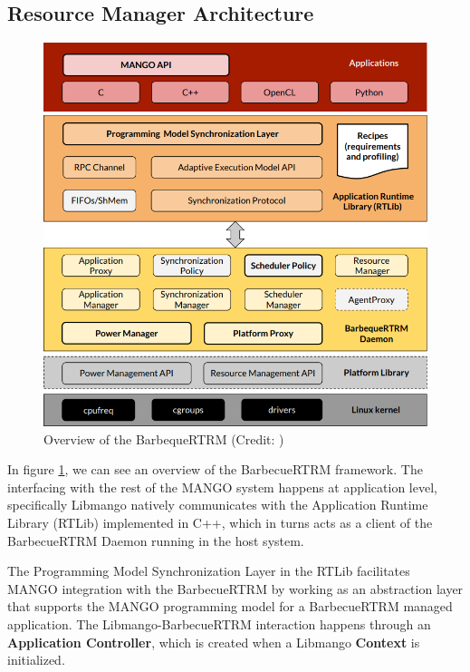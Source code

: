 \subsection{Resource Manager Architecture}

\begin{figure}[ht]
    \centering
    \includegraphics[width=\textwidth]{img/barbecue-arch.png}
    \captionsetup{justification=centering}
    \caption{Overview of the BarbequeRTRM (Credit: \cite{mango_exploring_manycore_architectures})}
    \label{fig:barbecue-arch}
\end{figure}

In figure \ref{fig:barbecue-arch}, we can see an overview of the BarbecueRTRM framework. The interfacing with the rest of the MANGO system happens at application level, specifically Libmango natively communicates with the Application Runtime Library (RTLib) implemented in C++, which in turns acts as a client of the BarbecueRTRM Daemon running in the host system.

The Programming Model Synchronization Layer in the RTLib facilitates MANGO integration with the BarbecueRTRM by working as an abstraction layer that supports the MANGO programming model for a BarbecueRTRM managed application.
The Libmango-BarbecueRTRM interaction happens through an \textbf{Application Controller}, which is created when a Libmango \textbf{Context} is initialized.

